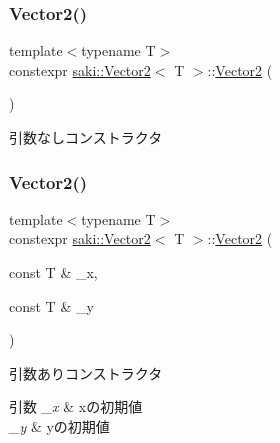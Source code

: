 \subsubsection{\texorpdfstring{Vector2()}{Vector2()}\hspace{0.1cm}{\footnotesize\ttfamily [1/7]}}
{\footnotesize\ttfamily template$<$typename T$>$ \\
constexpr \mbox{\hyperlink{classsaki_1_1_vector2}{saki\+::\+Vector2}}$<$ T $>$\+::\mbox{\hyperlink{classsaki_1_1_vector2}{Vector2}} (\begin{DoxyParamCaption}{ }\end{DoxyParamCaption})\hspace{0.3cm}{\ttfamily [inline]}}



引数なしコンストラクタ 

\mbox{\label{classsaki_1_1_vector2_ad0f3d0a05370f1ef4947520245f6e9a8}} 
\subsubsection{\texorpdfstring{Vector2()}{Vector2()}\hspace{0.1cm}{\footnotesize\ttfamily [2/7]}}
{\footnotesize\ttfamily template$<$typename T$>$ \\
constexpr \mbox{\hyperlink{classsaki_1_1_vector2}{saki\+::\+Vector2}}$<$ T $>$\+::\mbox{\hyperlink{classsaki_1_1_vector2}{Vector2}} (\begin{DoxyParamCaption}\item[{const T \&}]{\+\_\+x,  }\item[{const T \&}]{\+\_\+y }\end{DoxyParamCaption})\hspace{0.3cm}{\ttfamily [inline]}}



引数ありコンストラクタ 


\begin{DoxyParams}{引数}
{\em \+\_\+x} & xの初期値 \\
\hline
{\em \+\_\+y} & yの初期値 \\
\hline
\end{DoxyParams}
\mbox{\label{classsaki_1_1_vector2_aa23ab3fe9095929f882fbdbb01aa4470}} 
